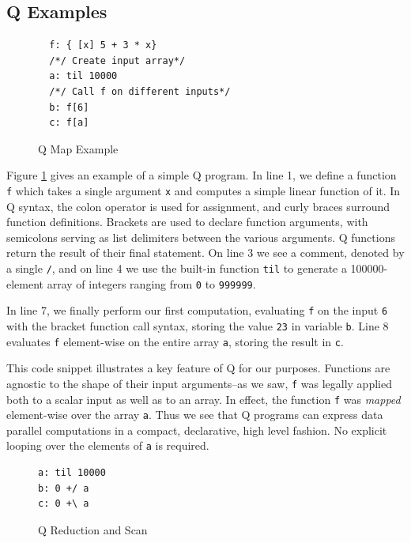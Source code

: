 \documentclass[preprint]{sigplanconf}
\begin{document}
\subsection{Q Examples}

\begin{figure}[h!]
  \begin{lstlisting}
  f: { [x] 5 + 3 * x}
  /*/ Create input array*/
  a: til 10000
  /*/ Call f on different inputs*/
  b: f[6]
  c: f[a]
  \end{lstlisting}

\caption{Q Map Example}
\label{QMap}
\end{figure}

Figure \ref{QMap} gives an example of a simple Q program.  In line 1, we define
a function \texttt{f} which takes a single argument \texttt{x} and computes a
simple linear function of it.  In Q syntax, the colon operator is used for
assignment, and curly braces surround function definitions.  Brackets are used
to declare function arguments, with semicolons serving as list delimiters
between the various arguments.  Q functions return the result of their final
statement.  On line 3 we see a comment, denoted by a single \texttt{/}, and on
line 4 we use the built-in function \texttt{til} to generate a
100000-element array of integers ranging from \texttt{0} to \texttt{999999}.

In line 7, we finally perform our first computation, evaluating \texttt{f} on
the input \texttt{6} with the bracket function call syntax, storing the
value \texttt{23} in variable \texttt{b}.  Line 8 evaluates \texttt{f}
element-wise on the entire array \texttt{a}, storing the result in \texttt{c}.

This code snippet illustrates a key feature of Q for our purposes.  Functions
are agnostic to the shape of their input arguments--as we saw, \texttt{f} was
legally applied both to a scalar input as well as to an array.  In effect, the
function \texttt{f} was {\it mapped} element-wise over the array \texttt{a}.
Thus we see that Q programs can express data parallel computations in a compact,
declarative, high level fashion.  No explicit looping over the elements of
\texttt{a} is required.

\begin{figure}[h!]
\begin{lstlisting}
a: til 10000
b: 0 +/ a
c: 0 +\ a
\end{lstlisting}
\label{QReduce}
\caption{Q Reduction and Scan}
\end{figure}
\end{document}
